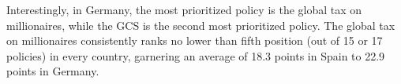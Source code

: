 Interestingly, in Germany, the most prioritized policy is the global tax on millionaires, while the GCS is the second most prioritized policy. The global tax on millionaires consistently ranks no lower than fifth position (out of 15 or 17 policies) in every country, garnering an average of 18.3 points in Spain to 22.9 points in Germany.


  

